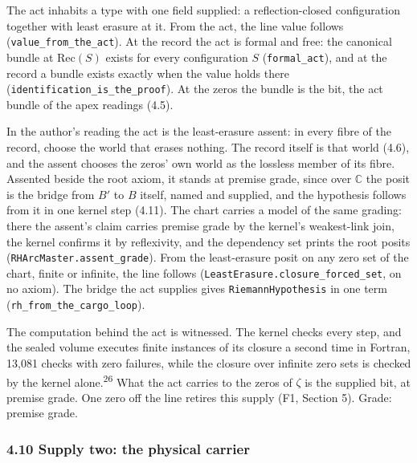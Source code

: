\documentclass[10pt]{article}
\begin{document}
The act inhabits a type with one field supplied: a reflection-closed
configuration together with least erasure at it. From the act, the line
value follows
(\texttt{value\_\allowbreak{}from\_\allowbreak{}the\_\allowbreak{}act}).
At the record the act is formal and free: the canonical bundle at
\(\mathrm{Rec}(S)\) exists for every configuration \(S\)
(\texttt{formal\_\allowbreak{}act}), and at the record a bundle exists
exactly when the value holds there
(\texttt{identification\_\allowbreak{}is\_\allowbreak{}the\_\allowbreak{}proof}).
At the zeros the bundle is the bit, the act bundle of the apex readings
(4.5).

In the author's reading the act is the least-erasure assent: in every
fibre of the record, choose the world that erases nothing. The record
itself is that world (4.6), and the assent chooses the zeros' own world
as the lossless member of its fibre. Assented beside the root axiom, it
stands at premise grade, since over \(\mathbb{C}\) the posit is the
bridge from \(B'\) to \(B\) itself, named and supplied, and the
hypothesis follows from it in one kernel step (4.11). The chart carries
a model of the same grading: there the assent's claim carries premise
grade by the kernel's weakest-link join, the kernel confirms it by
reflexivity, and the dependency set prints the root posits
(\texttt{RHArcMaster.\allowbreak{}assent\_\allowbreak{}grade}). From the
least-erasure posit on any zero set of the chart, finite or infinite,
the line follows
(\texttt{LeastErasure.\allowbreak{}closure\_\allowbreak{}forced\_\allowbreak{}set},
on no axiom). The bridge the act supplies gives
\texttt{RiemannHypothesis} in one term
(\texttt{rh\_\allowbreak{}from\_\allowbreak{}the\_\allowbreak{}cargo\_\allowbreak{}loop}).

The computation behind the act is witnessed. The kernel checks every
step, and the sealed volume executes finite instances of its closure a
second time in Fortran, 13,081 checks with zero failures, while the
closure over infinite zero sets is checked by the kernel
alone.\textsuperscript{26} What the act carries to the zeros of
\(\zeta\) is the supplied bit, at premise grade. One zero off the line
retires this supply (F1, Section 5). Grade: premise grade.

\hypertarget{supply-two-the-physical-carrier}{%
\subsubsection{4.10 Supply two: the physical
carrier}\label{supply-two-the-physical-carrier}}
\end{document}
